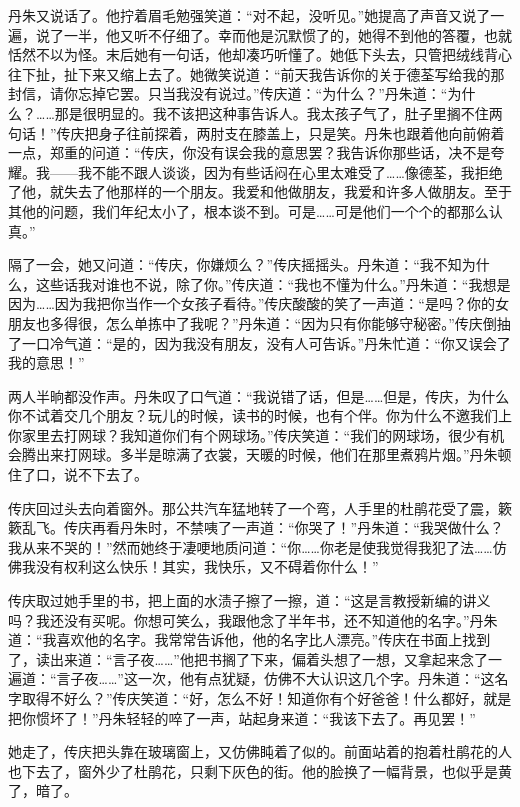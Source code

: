 \par 丹朱又说话了。他拧着眉毛勉强笑道：“对不起，没听见。”她提高了声音又说了一遍，说了一半，他又听不仔细了。幸而他是沉默惯了的，她得不到他的答覆，也就恬然不以为怪。末后她有一句话，他却凑巧听懂了。她低下头去，只管把绒线背心往下扯，扯下来又缩上去了。她微笑说道：“前天我告诉你的关于德荃写给我的那封信，请你忘掉它罢。只当我没有说过。”传庆道：“为什么？”丹朱道：“为什么？……那是很明显的。我不该把这种事告诉人。我太孩子气了，肚子里搁不住两句话！”传庆把身子往前探着，两肘支在膝盖上，只是笑。丹朱也跟着他向前俯着一点，郑重的问道：“传庆，你没有误会我的意思罢？我告诉你那些话，决不是夸耀。我——我不能不跟人谈谈，因为有些话闷在心里太难受了……像德荃，我拒绝了他，就失去了他那样的一个朋友。我爱和他做朋友，我爱和许多人做朋友。至于其他的问题，我们年纪太小了，根本谈不到。可是……可是他们一个个的都那么认真。”
\par 隔了一会，她又问道：“传庆，你嫌烦么？”传庆摇摇头。丹朱道：“我不知为什么，这些话我对谁也不说，除了你。”传庆道：“我也不懂为什么。”丹朱道：“我想是因为……因为我把你当作一个女孩子看待。”传庆酸酸的笑了一声道：“是吗？你的女朋友也多得很，怎么单拣中了我呢？”丹朱道：“因为只有你能够守秘密。”传庆倒抽了一口冷气道：“是的，因为我没有朋友，没有人可告诉。”丹朱忙道：“你又误会了我的意思！”
\par 两人半晌都没作声。丹朱叹了口气道：“我说错了话，但是……但是，传庆，为什么你不试着交几个朋友？玩儿的时候，读书的时候，也有个伴。你为什么不邀我们上你家里去打网球？我知道你们有个网球场。”传庆笑道：“我们的网球场，很少有机会腾出来打网球。多半是晾满了衣裳，天暖的时候，他们在那里煮鸦片烟。”丹朱顿住了口，说不下去了。
\par 传庆回过头去向着窗外。那公共汽车猛地转了一个弯，人手里的杜鹃花受了震，簌簌乱飞。传庆再看丹朱时，不禁咦了一声道：“你哭了！”丹朱道：“我哭做什么？我从来不哭的！”然而她终于凄哽地质问道：“你……你老是使我觉得我犯了法……仿佛我没有权利这么快乐！其实，我快乐，又不碍着你什么！”
\par 传庆取过她手里的书，把上面的水渍子擦了一擦，道：“这是言教授新编的讲义吗？我还没有买呢。你想可笑么，我跟他念了半年书，还不知道他的名字。”丹朱道：“我喜欢他的名字。我常常告诉他，他的名字比人漂亮。”传庆在书面上找到了，读出来道：“言子夜……”他把书搁了下来，偏着头想了一想，又拿起来念了一遍道：“言子夜……”这一次，他有点犹疑，仿佛不大认识这几个字。丹朱道：“这名字取得不好么？”传庆笑道：“好，怎么不好！知道你有个好爸爸！什么都好，就是把你惯坏了！”丹朱轻轻的啐了一声，站起身来道：“我该下去了。再见罢！”
\par 她走了，传庆把头靠在玻璃窗上，又仿佛盹着了似的。前面站着的抱着杜鹃花的人也下去了，窗外少了杜鹃花，只剩下灰色的街。他的脸换了一幅背景，也似乎是黄了，暗了。
